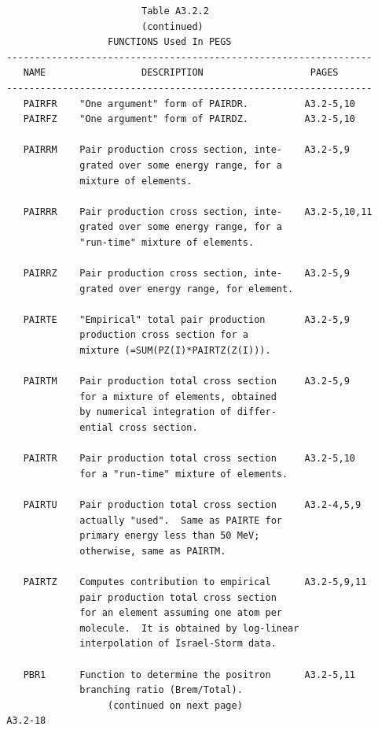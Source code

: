 \newpage {} \begin{verbatim}
                         Table A3.2.2
                         (continued)
                   FUNCTIONS Used In PEGS
 -----------------------------------------------------------------
    NAME                 DESCRIPTION                   PAGES
 -----------------------------------------------------------------
    PAIRFR    "One argument" form of PAIRDR.          A3.2-5,10
    PAIRFZ    "One argument" form of PAIRDZ.          A3.2-5,10
 
    PAIRRM    Pair production cross section, inte-    A3.2-5,9
              grated over some energy range, for a
              mixture of elements.
 
    PAIRRR    Pair production cross section, inte-    A3.2-5,10,11
              grated over some energy range, for a
              "run-time" mixture of elements.
 
    PAIRRZ    Pair production cross section, inte-    A3.2-5,9
              grated over energy range, for element.
 
    PAIRTE    "Empirical" total pair production       A3.2-5,9
              production cross section for a
              mixture (=SUM(PZ(I)*PAIRTZ(Z(I))).
 
    PAIRTM    Pair production total cross section     A3.2-5,9
              for a mixture of elements, obtained
              by numerical integration of differ-
              ential cross section.
 
    PAIRTR    Pair production total cross section     A3.2-5,10
              for a "run-time" mixture of elements.
 
    PAIRTU    Pair production total cross section     A3.2-4,5,9
              actually "used".  Same as PAIRTE for
              primary energy less than 50 MeV;
              otherwise, same as PAIRTM.
 
    PAIRTZ    Computes contribution to empirical      A3.2-5,9,11
              pair production total cross section
              for an element assuming one atom per
              molecule.  It is obtained by log-linear
              interpolation of Israel-Storm data.
 
    PBR1      Function to determine the positron      A3.2-5,11
              branching ratio (Brem/Total).
                   (continued on next page)
 A3.2-18 
\end{verbatim} 
